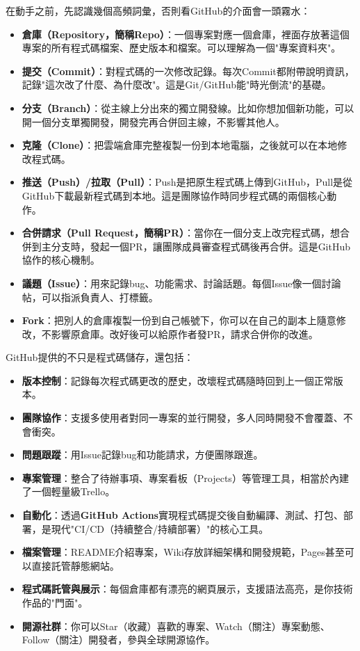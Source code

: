 
在動手之前，先認識幾個高頻詞彙，否則看GitHub的介面會一頭霧水：

\begin{itemize}
  \item \textbf{倉庫（Repository，簡稱Repo）}：一個專案對應一個倉庫，裡面存放著這個專案的所有程式碼檔案、歷史版本和檔案。可以理解為一個"專案資料夾"。
  \item \textbf{提交（Commit）}：對程式碼的一次修改記錄。每次Commit都附帶說明資訊，記錄"這次改了什麼、為什麼改"。這是Git/GitHub能"時光倒流"的基礎。
  \item \textbf{分支（Branch）}：從主線上分出來的獨立開發線。比如你想加個新功能，可以開一個分支單獨開發，開發完再合併回主線，不影響其他人。
  \item \textbf{克隆（Clone）}：把雲端倉庫完整複製一份到本地電腦，之後就可以在本地修改程式碼。
  \item \textbf{推送（Push）/拉取（Pull）}：Push是把原生程式碼上傳到GitHub，Pull是從GitHub下載最新程式碼到本地。這是團隊協作時同步程式碼的兩個核心動作。
  \item \textbf{合併請求（Pull Request，簡稱PR）}：當你在一個分支上改完程式碼，想合併到主分支時，發起一個PR，讓團隊成員審查程式碼後再合併。這是GitHub協作的核心機制。
  \item \textbf{議題（Issue）}：用來記錄bug、功能需求、討論話題。每個Issue像一個討論帖，可以指派負責人、打標籤。
  \item \textbf{Fork}：把別人的倉庫複製一份到自己帳號下，你可以在自己的副本上隨意修改，不影響原倉庫。改好後可以給原作者發PR，請求合併你的改進。
\end{itemize}


GitHub提供的不只是程式碼儲存，還包括：

\begin{itemize}
  \item \textbf{版本控制}：記錄每次程式碼更改的歷史，改壞程式碼隨時回到上一個正常版本。
  \item \textbf{團隊協作}：支援多使用者對同一專案的並行開發，多人同時開發不會覆蓋、不會衝突。
  \item \textbf{問題跟蹤}：用Issue記錄bug和功能請求，方便團隊跟進。
  \item \textbf{專案管理}：整合了待辦事項、專案看板（Projects）等管理工具，相當於內建了一個輕量級Trello。
  \item \textbf{自動化}：透過\textbf{GitHub Actions}實現程式碼提交後自動編譯、測試、打包、部署，是現代"CI/CD（持續整合/持續部署）"的核心工具。
  \item \textbf{檔案管理}：README介紹專案，Wiki存放詳細架構和開發規範，Pages甚至可以直接託管靜態網站。
  \item \textbf{程式碼託管與展示}：每個倉庫都有漂亮的網頁展示，支援語法高亮，是你技術作品的"門面"。
  \item \textbf{開源社群}：你可以Star（收藏）喜歡的專案、Watch（關注）專案動態、Follow（關注）開發者，參與全球開源協作。
\end{itemize}

